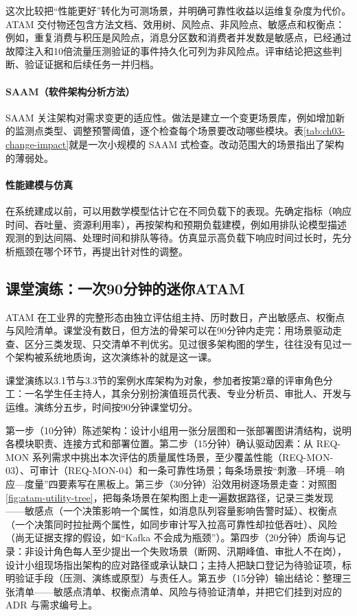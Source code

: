 这次比较把“性能更好”转化为可测场景，并明确可靠性收益以运维复杂度为代价。ATAM 交付物还包含方法文档、效用树、风险点、非风险点、敏感点和权衡点：例如，重复消费与积压是风险点，消息分区数和消费者并发数是敏感点，已经通过故障注入和10倍流量压测验证的事件持久化可列为非风险点。评审结论把这些判断、验证证据和后续任务一并归档。

\paragraph{SAAM（软件架构分析方法）}

SAAM 关注架构对需求变更的适应性。做法是建立一个变更场景库，例如增加新的监测点类型、调整预警阈值，逐个检查每个场景要改动哪些模块。表\ref{tab:ch03-change-impact}就是一次小规模的 SAAM 式检查。改动范围大的场景指出了架构的薄弱处。

\paragraph{性能建模与仿真}

在系统建成以前，可以用数学模型估计它在不同负载下的表现。先确定指标（响应时间、吞吐量、资源利用率），再按架构和预期负载建模，例如用排队论模型描述观测的到达间隔、处理时间和排队等待。仿真显示高负载下响应时间过长时，先分析瓶颈在哪个环节，再提出针对性的调整。

\subsection{课堂演练：一次90分钟的迷你ATAM}

ATAM 在工业界的完整形态由独立评估组主持、历时数日，产出敏感点、权衡点与风险清单。课堂没有数日，但方法的骨架可以在90分钟内走完：用场景驱动走查、区分三类发现、只交清单不判优劣。见过很多架构图的学生，往往没有见过一个架构被系统地质询，这次演练补的就是这一课。

课堂演练以3.1节与3.3节的案例水库架构为对象，参加者按第2章的评审角色分工：一名学生任主持人，其余分别扮演值班员代表、专业分析员、审批人、开发与运维。演练分五步，时间按90分钟课堂切分。

第一步（10分钟）陈述架构：设计小组用一张分层图和一张部署图讲清结构，说明各模块职责、连接方式和部署位置。第二步（15分钟）确认驱动因素：从 REQ-MON 系列需求中挑出本次评估的质量属性场景，至少覆盖性能（REQ-MON-03）、可审计（REQ-MON-04）和一条可靠性场景；每条场景按“刺激—环境—响应—度量”四要素写在黑板上。第三步（30分钟）沿效用树逐场景走查：对照图\ref{fig:atam-utility-tree}，把每条场景在架构图上走一遍数据路径，记录三类发现——敏感点（一个决策影响一个属性，如消息队列容量影响告警时延）、权衡点（一个决策同时拉扯两个属性，如同步审计写入拉高可靠性却拉低吞吐）、风险（尚无证据支撑的假设，如“Kafka 不会成为瓶颈”）。第四步（20分钟）质询与记录：非设计角色每人至少提出一个失败场景（断网、汛期峰值、审批人不在岗），设计小组现场指出架构的应对路径或承认缺口；主持人把缺口登记为待验证项，标明验证手段（压测、演练或原型）与责任人。第五步（15分钟）输出结论：整理三张清单——敏感点清单、权衡点清单、风险与待验证清单，并把它们挂到对应的 ADR 与需求编号上。

